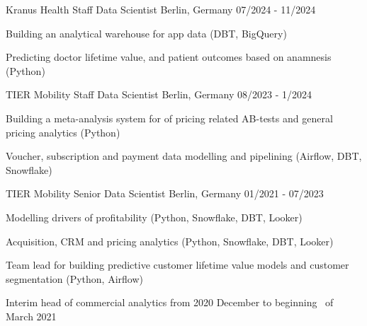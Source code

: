 
\begin{cventries}


  \cventry
    {Kranus Health} %
    {Staff Data Scientist} %
    {Berlin, Germany} %
    {07/2024 - 11/2024} %
    {
      \begin{cvitems}
        \item {Building an analytical warehouse for app data (DBT, BigQuery)}
        \item {Predicting doctor lifetime value, and patient outcomes based on anamnesis (Python)}
      \end{cvitems}
    }

  \cventry
    {TIER Mobility} %
    {Staff Data Scientist} %
    {Berlin, Germany} %
    {08/2023 - 1/2024} %
    {
      \begin{cvitems}
        \item {Building a meta-analysis system for of pricing related AB-tests and general pricing analytics (Python)}
        \item {Voucher, subscription and payment data modelling and pipelining (Airflow, DBT, Snowflake)}
      \end{cvitems}
    }

  \cventry
    {TIER Mobility} %
    {Senior Data Scientist} %
    {Berlin, Germany} %
    {01/2021 - 07/2023} %
    {
      \begin{cvitems}
        \item {Modelling drivers of profitability (Python, Snowflake, DBT, Looker)}
        \item {Acquisition, CRM and pricing analytics (Python, Snowflake, DBT, Looker)}
        \item {Team lead for building predictive customer lifetime
        value models and customer segmentation (Python, Airflow)}
        \item {Interim head of commercial analytics from 2020 December to beginning \
        of March 2021}
      \end{cvitems}
    }


\end{cventries}
